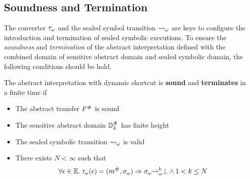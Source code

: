 \subsection{Soundness and Termination}

The converter ${\tau}_\omega$ and the sealed symbol transition ${\leadsto}_\omega$ are
keys to configure the introduction and termination of sealed symbolic
executions.  To ensure the \textit{soundness} and \textit{termination} of the
abstract interpretation defined with the combined domain of sensitive abstract
domain and sealed symbolic domain, the following conditions should be hold.

\begin{theorem}\label{theorem:shortcut}
  The abstract interpretation with dynamic shortcut is \textbf{sound} and
  \textbf{terminates} in a finite time if
  \begin{itemize}
    \item The abstract transfer ${F}^{\#}$ is sound
    \item The sensitive abstract domain ${\mathbb{D}}^{\#}_\delta$ has finite height
    \item The sealed symbolic transition ${\leadsto}_\omega$ is valid
    \item There exists $N < \infty$ such that
      \[
        \forall \epsilon \in \mathbb{E}. \; {\tau}_\omega(\epsilon) = ({m}^{\#},
        {\sigma}_\omega) \Rightarrow {\sigma}_\omega
        {\leadsto}_\omega^k \bot \wedge 1 < k \leq N
      \]
  \end{itemize}
\end{theorem}


